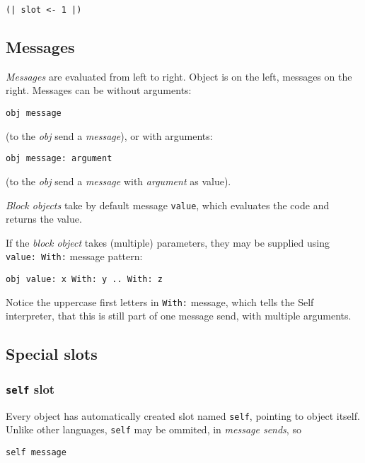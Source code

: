 \documentclass[10pt]{article}
\begin{document}
\begin{multicols*}{3}
\begin{lstlisting}
(| slot <- 1 |)
\end{lstlisting}




\subsection{Messages}

\textit{Messages} are evaluated from left to right. Object is on the left, messages on the right. Messages can be without arguments:

\begin{lstlisting}
obj message
\end{lstlisting}

(to the \textit{obj} send a \textit{message}), or with arguments:

\begin{lstlisting}
obj message: argument
\end{lstlisting}

(to the \textit{obj} send a \textit{message} with \textit{argument} as value).

\textit{Block objects} take by default message \texttt{value}, which evaluates the code and returns the value.

If the \textit{block object} takes (multiple) parameters, they may be supplied using \texttt{value:\ With:} message pattern:

\begin{lstlisting}
obj value: x With: y .. With: z
\end{lstlisting}

Notice the uppercase first letters in \texttt{With:} message, which tells the Self interpreter, that this is still part of one message send, with multiple arguments.




\subsection{Special slots}

\subsubsection{\texttt{self} slot}
Every object has automatically created slot named \texttt{self}, pointing to object itself. Unlike other languages, \texttt{self} may be ommited, in \textit{message sends}, so

\begin{lstlisting}
self message
\end{lstlisting}


\end{multicols*}
\end{document}
